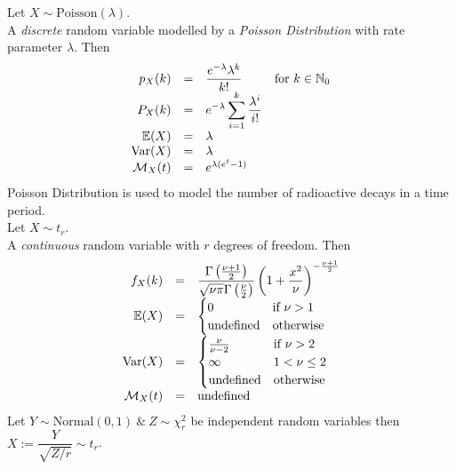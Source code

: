 \documentclass[11pt,a4paper]{article}
\begin{document}
Let $X\sim\text{Poisson}(\lambda)$.\\
A \textit{discrete} random variable modelled by a \textit{Poisson Distribution} with rate parameter $\lambda$. Then
\[\begin{array}{rcll}
p_X(k)&=&\dfrac{e^{-\lambda}\lambda^k}{k!}&\text{for }k\in\mathbb{N}_0\\
P_X(k)&=&{\displaystyle e^{-\lambda}\sum_{i=1}^k\frac{\lambda^i}{i!}}\\
\mathbb{E}(X)&=&\lambda\\
\mathrm{Var}(X)&=&\lambda\\
\mathcal{M}_X(t)&=&e^{\lambda(e^t-1)}
\end{array}\]
\nb Poisson Distribution is used to model the number of radioactive decays in a time period.\\

Let $X\sim t_r$.\\
A \textit{continuous} random variable with $r$ degrees of freedom. Then
\[\begin{array}{rcll}
f_X(k)&=&{\displaystyle\frac{\Gamma\left(\frac{\nu+1}{2}\right)}{\sqrt{\nu\pi}\Gamma\left(\frac{\nu}{2}\right)}\left(1+\frac{x^2}{\nu}\right)^{-\frac{\nu+1}{2}}}\\
\mathbb{E}(X)&=&\begin{cases}0&\text{if }\nu>1\\\text{undefined}&\text{otherwise}\end{cases}\\
\mathrm{Var}(X)&=&\begin{cases}\frac{\nu}{\nu-2}&\text{if }\nu>2\\\infty&1<\nu\leq2\\\text{undefined}&\text{otherwise}\end{cases}\\
\mathcal{M}_X(t)&=&\text{undefined}
\end{array}\]
\nb Let $Y\sim\text{Normal}(0,1)\ \&\ Z\sim\chi^2_r$ be independent random variables then $X:=\dfrac{Y}{\sqrt{Z/r}}\sim t_r$.\\
\end{document}
